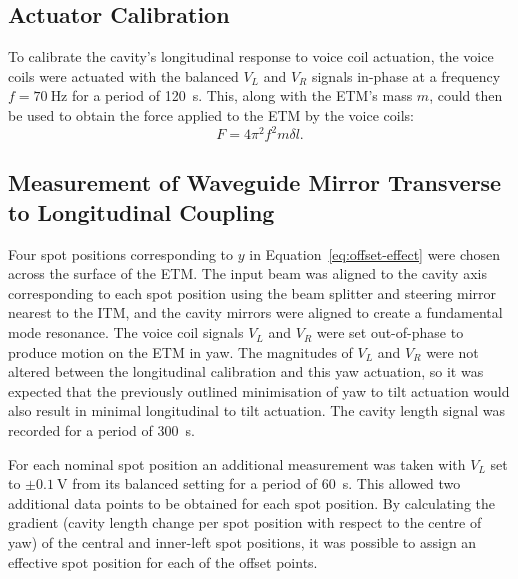 \subsection{Actuator Calibration}

To calibrate the cavity's longitudinal response to voice coil actuation, the voice coils were actuated with the balanced $V_L$ and $V_R$ signals in-phase at a frequency $f = \SI{70}{\hertz}$ for a period of \SI{120}{\second}. This, along with the \gls{ETM}'s mass $m$, could then be used to obtain the force applied to the \gls{ETM} by the voice coils:
\begin{equation}
  F = 4 \pi^2 f^2 m \delta l.
  \label{eq:force-calibration}
\end{equation}

\subsection{Measurement of Waveguide Mirror Transverse to Longitudinal Coupling}
\label{sec:length-changes}


Four spot positions corresponding to $y$ in Equation~\ref{eq:offset-effect} were chosen across the surface of the \gls{ETM}. The input beam was aligned to the cavity axis corresponding to each spot position using the beam splitter and steering mirror nearest to the \gls{ITM}, and the cavity mirrors were aligned to create a fundamental mode resonance. The voice coil signals $V_L$ and $V_R$ were set out-of-phase to produce motion on the \gls{ETM} in yaw. The magnitudes of $V_L$ and $V_R$ were not altered between the longitudinal calibration and this yaw actuation, so it was expected that the previously outlined minimisation of yaw to tilt actuation would also result in minimal longitudinal to tilt actuation. The cavity length signal was recorded for a period of \SI{300}{\second}.

For each nominal spot position an additional measurement was taken with $V_L$ set to $\pm \SI{0.1}{\volt}$ from its balanced setting for a period of \SI{60}{\second}. This allowed two additional data points to be obtained for each spot position. By calculating the gradient (cavity length change per spot position with respect to the centre of yaw) of the central and inner-left spot positions, it was possible to assign an effective spot position for each of the offset points.

